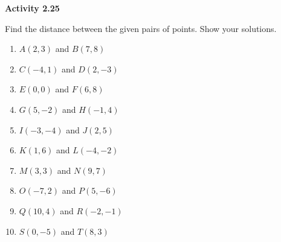 \vspace{0.3ex}
\noindent\textbf{Activity 2.25}

\vspace{0.2ex}

Find the distance between the given pairs of points. Show your solutions.
\begin{multicols}{2}
\begin{enumerate}
    \item $A(2,3)$ and $B(7,8)$
    \item $C(-4,1)$ and $D(2,-3)$
    \item $E(0,0)$ and $F(6,8)$
    \item $G(5,-2)$ and $H(-1,4)$
    \item $I(-3,-4)$ and $J(2,5)$
    \item $K(1,6)$ and $L(-4,-2)$
    \item $M(3,3)$ and $N(9,7)$
    \item $O(-7,2)$ and $P(5,-6)$
    \item $Q(10,4)$ and $R(-2,-1)$
    \item $S(0,-5)$ and $T(8,3)$
\end{enumerate}
\end{multicols}
